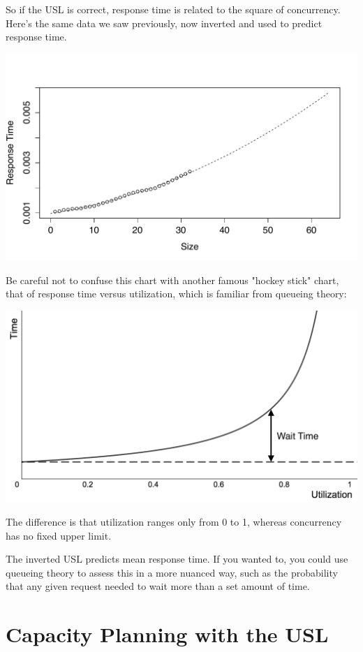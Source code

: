 \documentclass{vivid_layout}
\begin{document}
So if the USL is correct, response time is related to the square of
concurrency. Here's the same data we saw previously, now inverted and used to
predict response time.
\begin{center}
\includegraphics[width=.85\linewidth]{scalability/cisco-tput}
\end{center}

Be careful not to confuse this chart with another famous "hockey stick" chart,
that of response time versus utilization, which is familiar from queueing
theory:
\begin{center}
\includegraphics[width=.85\linewidth]{queueing-theory/hockey-stick-1}
\end{center}

The difference is that utilization ranges only from 0 to 1, whereas concurrency
has no fixed upper limit.

The inverted USL predicts mean response time. If you wanted to, you could
use queueing theory to assess this in a more nuanced way, such as the
probability that any given request needed to wait more than a set amount of
time.

\section{Capacity Planning with the USL}
\end{document}

